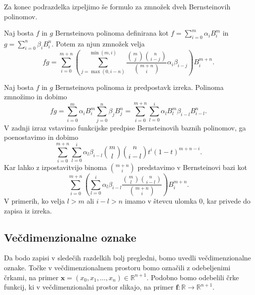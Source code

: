 \documentclass[isrm2, tisk]{fmfdelo}
\newcommand{\R}{\mathbb R}
\begin{document}
    Za konec podrazdelka izpeljimo še formulo za zmnožek dveh Bernsteinovih polinomov.
    \begin{izrek}
        Naj bosta $f$ in $g$ Bernsteinova polinoma definirana kot $f=\sum_{i=0}^{m}\alpha_iB_i^m$ in $g=\sum_{i=0}^{n}\beta_iB_i^n$.
        Potem za njun zmnožek velja
        \[ fg = \sum_{i=0}^{m+n}\left(\sum_{j=\max(0,i-n)}^{\min(m,i)} \frac{\binom{m}{j}\binom{n}{i-j}}{\binom{m+n}{i}} \alpha_i\beta_{i-j} \right)B_{i}^{m+n}.\]
    \end{izrek}
    \begin{dokaz}
        Naj bosta $f$ in $g$ Bernsteinova polinoma iz predpostavk izreka.
        Polinoma zmnožimo in dobimo
        \[fg =\sum_{i=0}^{m}\alpha_iB_{i}^{m}\sum_{j=0}^{n}\beta_jB_{j}^{n} = \sum_{i=0}^{m+n}\sum_{l=0}^i \alpha_lB_{l}^{m}\beta_{i-l}B_{i-l}^{n}. \]
        V zadnji izraz vstavimo funkcijske predpise Bernsteinovih baznih polinomov, ga poenostavimo in dobimo
        \[\sum_{i=0}^{m+n}\sum_{l=0}^i \alpha_l \beta_{i-l} \binom{m}{l}\binom{n}{i-l}t^{i}(1-t)^{m+n-i}.\]
        Kar lahko z izpostavitvijo binoma $\binom{m+n}{i}$ predstavimo v Bernsteinovi bazi kot
        \[\sum_{i=0}^{m+n} \left(\sum_{l=0}^i  \alpha_l \beta_{i-l}\frac{\binom{m}{l}\binom{n}{i-l}}{\binom{m+n}{i}}\right) B_{i}^{m+n}.\]
        V primerih, ko velja $l>m$ ali $i-l>n$ imamo v števcu ulomka $0$, kar privede do zapisa iz izreka.
    \end{dokaz}

    \subsection{Večdimenzionalne oznake}
    Da bodo zapisi v sledečih razdelkih bolj pregledni, bomo uvedli večdimenzionalne oznake.
    Točke v večdimenzionalnem prostoru bomo označili z odebeljenimi črkami, na primer $\mathbf{x}=(x_0,x_1,\dots,x_n)\in\R^{n+1}$.
    Podobno bomo odebelili črke funkcij, ki v večdimenzionalni prostor slikajo, na primer $\mathbf{f}:\R\to\R^{n+1}$.
\end{document}
